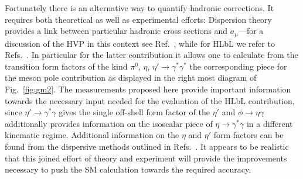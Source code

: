 Fortunately there is an alternative way to quantify hadronic corrections. It requires both
theoretical as well as experimental efforts:
Dispersion theory provides a link between particular hadronic cross sections
and $a_\mu$---for a discussion of the HVP in this context see Ref.~\cite{Jegerlehner:2009ry}, while 
for HLbL we refer to Refs.~\cite{Colangelo:2014dfa,Pauk:2014rfa,Colangelo:2014pva,Colangelo:2015ama}.  
In particular for the latter contribution it allows one to calculate from the transition
form factors of the kind $\pi^0$, $\eta$, $\eta'\to \gamma^*\gamma^*$ 
the corresponding piece for the meson pole contribution as displayed in the
right most diagram of Fig.~\ref{fig:gm2}.
The measurements proposed here provide important information towards
the necessary input needed for the evaluation of the HLbL contribution, since
$\eta'\to \gamma^*\gamma$ gives the single off-shell form factor of the $\eta'$
and $\phi\to \eta\gamma$ additionally provides information on the isoscalar
piece of $\eta\to \gamma^*\gamma$ in a different kinematic regime.
Additional information on the  $\eta$ and
$\eta'$ form factors can be found from the dispersive methods outlined in
Refs.~\cite{Adlarson:2011xb,Stollenwerk:2011zz,Hanhart:2013vba,Kubis:2015sga,Xiao:2015uva}.
It  appears to be realistic that this joined effort of theory and experiment
will provide the improvements necessary to push the SM calculation towards
the required accuracy.
